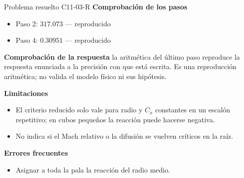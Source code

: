 \documentclass[10pt,openany]{book}
\begin{document}
\begin{studiumworked}{Problema resuelto C11-03-R}
\noindent\textbf{Comprobación de los pasos}
\begin{itemize}
\item Paso 2: $317.073$ — reproducido
\item Paso 4: $0.30951$ — reproducido
\end{itemize}

\noindent\textbf{Comprobación de la respuesta} la aritmética del último paso reproduce la respuesta enunciada a la precisión con que está escrita. Es una reproducción aritmética; no valida el modelo físico ni sus hipótesis.

\noindent\textbf{Limitaciones}
\begin{itemize}
\item El criterio reducido solo vale para radio y $C_x$ constantes en un escalón repetitivo; en cubos pequeños la reacción puede hacerse negativa.
\item No indica si el Mach relativo o la difusión se vuelven críticos en la raíz.
\end{itemize}

\noindent\textbf{Errores frecuentes}
\begin{itemize}
\item Asignar a toda la pala la reacción del radio medio.
\end{itemize}
\end{studiumworked}
\end{document}
